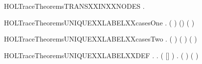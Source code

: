 \newcommand{\HOLTraceTheoremsTRACEXXtransXXapplied}{\UseVerbatim{HOLTraceTheoremsTRACEXXtransXXapplied}}
\begin{SaveVerbatim}{HOLTraceTheoremsTRANSXXINXXNODES}
\HOLTokenTurnstile{} \HOLSymConst{\HOLTokenForall{}}  .  \HOLTokenTransBegin{}\HOLTokenTransEnd {} \HOLSymConst{\HOLTokenImp{}}  \HOLConst{\HOLTokenIn{}}  
\end{SaveVerbatim}
\newcommand{\HOLTraceTheoremsTRANSXXINXXNODES}{\UseVerbatim{HOLTraceTheoremsTRANSXXINXXNODES}}
\begin{SaveVerbatim}{HOLTraceTheoremsUNIQUEXXLABELXXcasesOne}
\HOLTokenTurnstile{} \HOLSymConst{\HOLTokenForall{}} .
        ( ) (\HOLConst{\ensuremath{\tau}}\HOLSymConst{::}) \HOLSymConst{\HOLTokenEquiv{}}
        ( ) 
\end{SaveVerbatim}
\newcommand{\HOLTraceTheoremsUNIQUEXXLABELXXcasesOne}{\UseVerbatim{HOLTraceTheoremsUNIQUEXXLABELXXcasesOne}}
\begin{SaveVerbatim}{HOLTraceTheoremsUNIQUEXXLABELXXcasesTwo}
\HOLTokenTurnstile{} \HOLSymConst{\HOLTokenForall{}}  .
        ( ) ( \HOLSymConst{::}) \HOLSymConst{\HOLTokenEquiv{}}
       ( \HOLSymConst{=} ) \HOLSymConst{\HOLTokenConj{}}  
\end{SaveVerbatim}
\newcommand{\HOLTraceTheoremsUNIQUEXXLABELXXcasesTwo}{\UseVerbatim{HOLTraceTheoremsUNIQUEXXLABELXXcasesTwo}}
\begin{SaveVerbatim}{HOLTraceTheoremsUNIQUEXXLABELXXDEF}
\HOLTokenTurnstile{} \HOLSymConst{\HOLTokenForall{}} .
          \HOLSymConst{\HOLTokenEquiv{}}
       \HOLSymConst{\HOLTokenExists{}} .
           ( \HOLSymConst{++} [] \HOLSymConst{++}  \HOLSymConst{=} ) \HOLSymConst{\HOLTokenConj{}}
           \HOLSymConst{\HOLTokenNeg{}}\HOLSymConst{\HOLTokenExists{}}.  ( )  \HOLSymConst{\HOLTokenDisj{}}  ( ) 
\end{SaveVerbatim}
